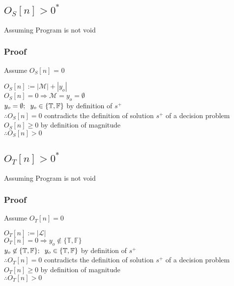 \documentclass[11pt]{article}
\begin{document}
\subsection{$O_S[n] > 0^*$}
Assuming Program is not void
\subsubsection{Proof}
Assume $O_S[n]$ = 0
\begin{center}
$
O_S[n] := |\mathcal{M}| + |y_o| 
$
\\ \vspace{2mm}
$
O_S[n] = 0 \Rightarrow \mathcal{M} = y_o = \emptyset
$
\\ \vspace{2mm}
$
y_o = \emptyset; \hspace{2mm} y_o \in \{\mathbb{T},\mathbb{F}\}$ by definition of $s^+$
\\ \vspace{4mm}
$
\therefore O_S[n] = 0$ contradicts the definition of solution $s^+$ of a decision problem
\\ \vspace{2mm}
$
O_S[n] \geq 0$ by definition of magnitude
\\ \vspace{2mm}
$
\therefore O_S[n] > 0
$
\end{center}


\subsection{$O_T[n] > 0^*$}
Assuming Program is not void
\subsubsection{Proof}
Assume $O_T[n] = 0$
\begin{center}
$
O_T[n] := |\mathcal{L}| 
$
\\ \vspace{2mm}
$
O_T[n] = 0 \Rightarrow y_o \not \in \{\mathbb{T},\mathbb{F}\}
$
\\ \vspace{2mm}
$
y_o \not \in \{\mathbb{T},\mathbb{F}\}; \hspace{2mm} y_o \in \{\mathbb{T},\mathbb{F}\}$ by definition of $s^+$
\\ \vspace{4mm}
$
\therefore O_T[n] = 0$ contradicts the definition of solution $s^+$ of a decision problem
\\ \vspace{2mm}
$
O_T[n] \geq 0$ by definition of magnitude
\\ \vspace{2mm}
$
\therefore O_T[n] > 0
$
\end{center}
\end{document}
